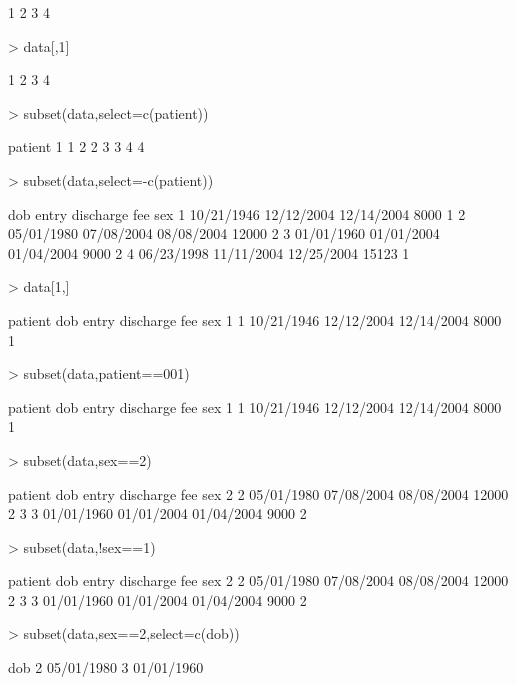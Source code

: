 \documentclass[12pt]{article}
\begin{document}
\begin{Schunk}
\begin{Soutput}
[1] 1 2 3 4
\end{Soutput}
\begin{Sinput}
> data[,1]
\end{Sinput}
\begin{Soutput}
[1] 1 2 3 4
\end{Soutput}
\begin{Sinput}
> subset(data,select=c(patient))
\end{Sinput}
\begin{Soutput}
  patient
1       1
2       2
3       3
4       4
\end{Soutput}
\begin{Sinput}
> subset(data,select=-c(patient))
\end{Sinput}
\begin{Soutput}
         dob      entry  discharge   fee sex
1 10/21/1946 12/12/2004 12/14/2004  8000   1
2 05/01/1980 07/08/2004 08/08/2004 12000   2
3 01/01/1960 01/01/2004 01/04/2004  9000   2
4 06/23/1998 11/11/2004 12/25/2004 15123   1
\end{Soutput}
\begin{Sinput}
> data[1,]
\end{Sinput}
\begin{Soutput}
  patient        dob      entry  discharge  fee sex
1       1 10/21/1946 12/12/2004 12/14/2004 8000   1
\end{Soutput}
\begin{Sinput}
> subset(data,patient==001)
\end{Sinput}
\begin{Soutput}
  patient        dob      entry  discharge  fee sex
1       1 10/21/1946 12/12/2004 12/14/2004 8000   1
\end{Soutput}
\begin{Sinput}
> subset(data,sex==2)
\end{Sinput}
\begin{Soutput}
  patient        dob      entry  discharge   fee sex
2       2 05/01/1980 07/08/2004 08/08/2004 12000   2
3       3 01/01/1960 01/01/2004 01/04/2004  9000   2
\end{Soutput}
\begin{Sinput}
> subset(data,!sex==1)
\end{Sinput}
\begin{Soutput}
  patient        dob      entry  discharge   fee sex
2       2 05/01/1980 07/08/2004 08/08/2004 12000   2
3       3 01/01/1960 01/01/2004 01/04/2004  9000   2
\end{Soutput}
\begin{Sinput}
> subset(data,sex==2,select=c(dob))
\end{Sinput}
\begin{Soutput}
         dob
2 05/01/1980
3 01/01/1960
\end{Soutput}
\end{Schunk}
\end{document}
